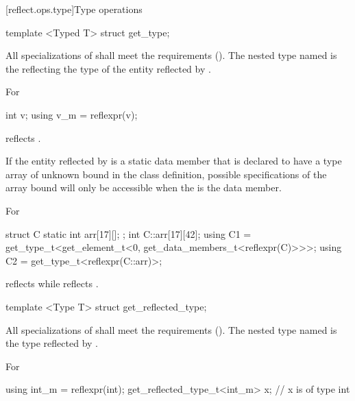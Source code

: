 [reflect.ops.type]{Type operations}

\begin{std.txt}\color{addclr}

\begin{itemdecl}
template <Typed T> struct get_type;
\end{itemdecl}

\begin{itemdescr}
\pnum
All specializations of  shall meet the  requirements (). The nested type named  is the  reflecting the type of the entity reflected by .

\pnum
\begin{example}
For
\begin{codeblock}
int v; using v_m = reflexpr(v);
\end{codeblock}
 reflects .
\end{example}

\pnum
If the entity reflected by  is a static data member that is declared to have a type array of unknown bound in the class definition, possible specifications of the array bound will only be accessible when the  is the data member.

\pnum
\begin{note}
For
\begin{codeblock}
struct C {
   static int arr[17][];
};
int C::arr[17][42];
using C1 = get_type_t<get_element_t<0, get_data_members_t<reflexpr(C)>>>;
using C2 = get_type_t<reflexpr(C::arr)>;
\end{codeblock}
 reflects  while  reflects .
\end{note}

\end{itemdescr}
\begin{itemdecl}
template <Type T> struct get_reflected_type;
\end{itemdecl}

\begin{itemdescr}
\pnum
All specializations of  shall meet the  requirements (). The nested type named  is the type reflected by .

\pnum
\begin{example}
For
\begin{codeblock}
using int_m = reflexpr(int);
get_reflected_type_t<int_m> x; // x is of type int
\end{codeblock}
\end{example}
\end{itemdescr}


\end{std.txt}
